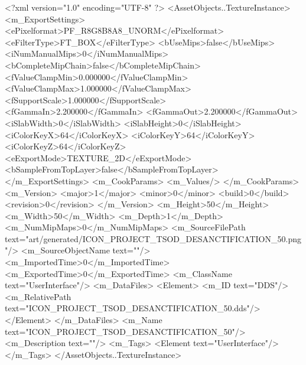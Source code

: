 <?xml version="1.0" encoding="UTF-8" ?>
<AssetObjects..TextureInstance>
	<m_ExportSettings>
		<ePixelformat>PF_R8G8B8A8_UNORM</ePixelformat>
		<eFilterType>FT_BOX</eFilterType>
		<bUseMips>false</bUseMips>
		<iNumManualMips>0</iNumManualMips>
		<bCompleteMipChain>false</bCompleteMipChain>
		<fValueClampMin>0.000000</fValueClampMin>
		<fValueClampMax>1.000000</fValueClampMax>
		<fSupportScale>1.000000</fSupportScale>
		<fGammaIn>2.200000</fGammaIn>
		<fGammaOut>2.200000</fGammaOut>
		<iSlabWidth>0</iSlabWidth>
		<iSlabHeight>0</iSlabHeight>
		<iColorKeyX>64</iColorKeyX>
		<iColorKeyY>64</iColorKeyY>
		<iColorKeyZ>64</iColorKeyZ>
		<eExportMode>TEXTURE_2D</eExportMode>
		<bSampleFromTopLayer>false</bSampleFromTopLayer>
	</m_ExportSettings>
	<m_CookParams>
		<m_Values/>
	</m_CookParams>
	<m_Version>
		<major>1</major>
		<minor>0</minor>
		<build>0</build>
		<revision>0</revision>
	</m_Version>
	<m_Height>50</m_Height>
	<m_Width>50</m_Width>
	<m_Depth>1</m_Depth>
	<m_NumMipMaps>0</m_NumMipMaps>
	<m_SourceFilePath text="art/generated/ICON_PROJECT_TSOD_DESANCTIFICATION_50.png"/>
	<m_SourceObjectName text=""/>
	<m_ImportedTime>0</m_ImportedTime>
	<m_ExportedTime>0</m_ExportedTime>
	<m_ClassName text="UserInterface"/>
	<m_DataFiles>
		<Element>
			<m_ID text="DDS"/>
			<m_RelativePath text="ICON_PROJECT_TSOD_DESANCTIFICATION_50.dds"/>
		</Element>
	</m_DataFiles>
	<m_Name text="ICON_PROJECT_TSOD_DESANCTIFICATION_50"/>
	<m_Description text=""/>
	<m_Tags>
		<Element text="UserInterface"/>
	</m_Tags>
</AssetObjects..TextureInstance>
